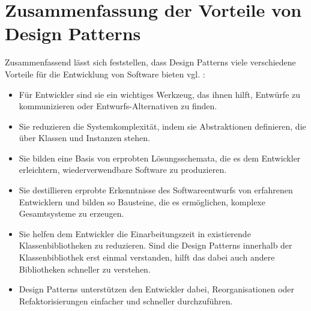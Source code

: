 \documentclass[fontsize=11pt,a4paper,final]{scrreprt}[2003/01/01]
\begin{document}
\section{Zusammenfassung der Vorteile von Design Patterns}
Zusammenfassend lässt sich feststellen, dass Design Patterns viele verschiedene Vorteile für die Entwicklung von Software bieten vgl. \cite{Gamma1993}:
\begin{itemize}
	\item Für Entwickler sind sie ein wichtiges Werkzeug, das ihnen hilft, Entwürfe zu kommunizieren oder Entwurfs-Alternativen zu finden.
	\item Sie reduzieren die Systemkomplexität, indem sie Abstraktionen definieren, die über Klassen und Instanzen stehen.
	\item Sie bilden eine Basis von erprobten Lösungsschemata, die es dem Entwickler erleichtern, wiederverwendbare Software zu produzieren.
	\item Sie destillieren erprobte Erkenntnisse des Softwareentwurfs von erfahrenen Entwicklern und bilden so Bausteine, die es ermöglichen, komplexe Gesamtsysteme zu erzeugen.
	\item Sie helfen dem Entwickler die Einarbeitungszeit in existierende Klassenbibliotheken zu reduzieren. Sind die Design Patterns innerhalb der Klassenbibliothek erst einmal verstanden, hilft das dabei auch andere Bibliotheken schneller zu verstehen.
	\item Design Patterns unterstützen den Entwickler dabei, Reorganisationen oder Refaktorisierungen einfacher und schneller durchzuführen.
\end{itemize}
\end{document}
